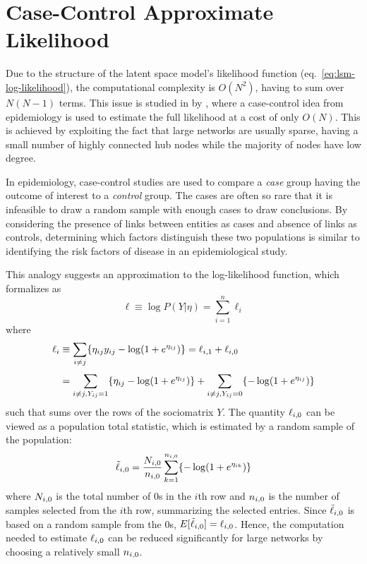 \section{Case-Control Approximate Likelihood}

Due to the structure of the latent space model's likelihood function (eq.~\ref{eq:lsm-log-likelihood}), the computational complexity is $O(N^2)$, having to sum over $N(N-1)$ terms. This issue is studied in \cite{raftery2012fast} by \citeauthor{raftery2012fast}, where a case-control idea from epidemiology is used to estimate the full likelihood at a cost of only $O(N)$. This is achieved by exploiting the fact that large networks are usually sparse, having a small number of highly connected hub nodes while the majority of nodes have low degree.

In epidemiology, case-control studies are used to compare a \emph{case} group having the outcome of interest to a \emph{control} group. The cases are often so rare that it is infeasible to draw a random sample with enough cases to draw conclusions.
By considering the presence of links between entities as cases and absence of links as controls, determining which factors distinguish these two populations is similar to identifying the risk factors of disease in an epidemiological study.

This analogy suggests an approximation to the log-likelihood function, which \citeauthor*{raftery2012fast} formalizes as
\begin{equation}
\label{eq:case-likelihood-approx}
    \ell \equiv \log P(Y|\eta)=\sum_{i=1}^n \ell_i
\end{equation}
where
\begin{equation}
    \setlength{\jot}{0.5\baselineskip}
    \begin{split}
        \ell_i &\equiv \sum_{i\neq j}\{\sub(\eta)\sub(y)-\log(1+e^{\sub(\eta)})\} = \sub(\ell)(i,1) + \sub(\ell)(i,0)\\
        &= \sum_{i\neq j, \sub(Y)=1} \{\sub(\eta)-\log(1+e^{\sub(\eta)}) \} + \sum_{i\neq j, \sub(Y)=0} \{-\log(1+e^{\sub(\eta)}) \} \\
    \end{split}
\end{equation}
such that  sums over the rows of the sociomatrix $Y$. The quantity $\sub(\ell)(i,0)$ can be viewed as a population total statistic, which is estimated by a random sample of the population:
\begin{equation}
    \sub(\tilde{\ell})(i,0)=\frac{\sub(N)(i,0)}{\sub(n)(i,0)} \sum_{k=1}^{\sub(n)(i,0)} \{ -\log(1+e^{\sub(\eta)(ik)}) \}
\end{equation}
where $\sub(N)(i,0)$ is the total number of 0s in the $i$th row and $\sub(n)(i,0)$ is the number of samples selected from the $i$th row, summarizing the selected entries. Since $\sub(\tilde{\ell})(i,0)$ is based on a random sample from the 0s, $E[\sub(\tilde{\ell})(i,0)] = \sub(\ell)(i,0)$. Hence, the computation needed to estimate $\sub(\ell)(i,0)$ can be reduced significantly for large networks by choosing a relatively small $\sub(n)(i,0)$.

